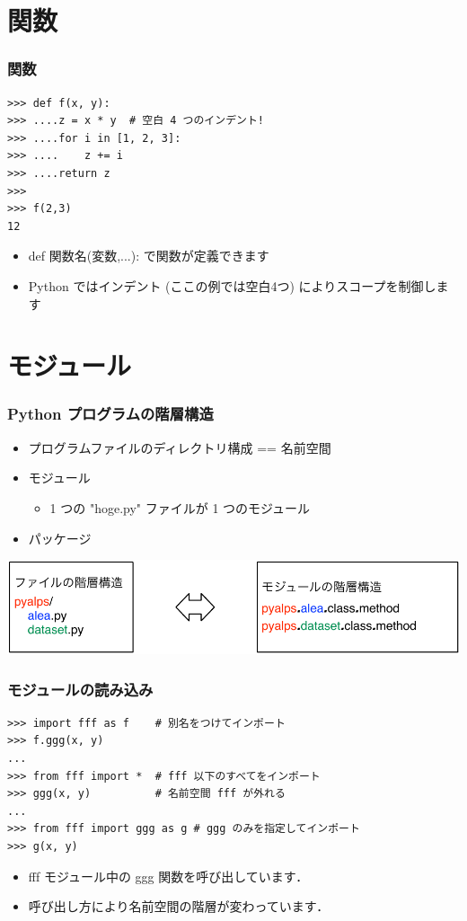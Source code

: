 \section{関数}
\begin{frame}[t,fragile]
\frametitle{関数}
\begin{lstlisting}
>>> def f(x, y):
>>> ....z = x * y  # 空白 4 つのインデント!
>>> ....for i in [1, 2, 3]:
>>> ....    z += i
>>> ....return z
>>>
>>> f(2,3)
12
\end{lstlisting}
\begin{itemize}
\item def 関数名(変数,...): で関数が定義できます
\item Python ではインデント (ここの例では空白4つ) によりスコープを制御します
\end{itemize}
\end{frame}

\section{モジュール}
\begin{frame}[t]
\frametitle{Python プログラムの階層構造}
\begin{itemize}
\item プログラムファイルのディレクトリ構成 == 名前空間
\item モジュール
\begin{itemize}
 \item 1 つの "hoge.py" ファイルが 1 つのモジュール
\end{itemize}
\item パッケージ
\end{itemize}
\includegraphics[width=\textwidth]{module.pdf}
\end{frame}

\begin{frame}[t,fragile]
\frametitle{モジュールの読み込み}
\begin{lstlisting}
>>> import fff as f    # 別名をつけてインポート
>>> f.ggg(x, y)
...
>>> from fff import *  # fff 以下のすべてをインポート
>>> ggg(x, y)          # 名前空間 fff が外れる
...
>>> from fff import ggg as g # ggg のみを指定してインポート
>>> g(x, y)
\end{lstlisting}
\begin{itemize}
\item fff モジュール中の ggg 関数を呼び出しています．
\item 呼び出し方により名前空間の階層が変わっています．
\end{itemize}

\end{frame}

